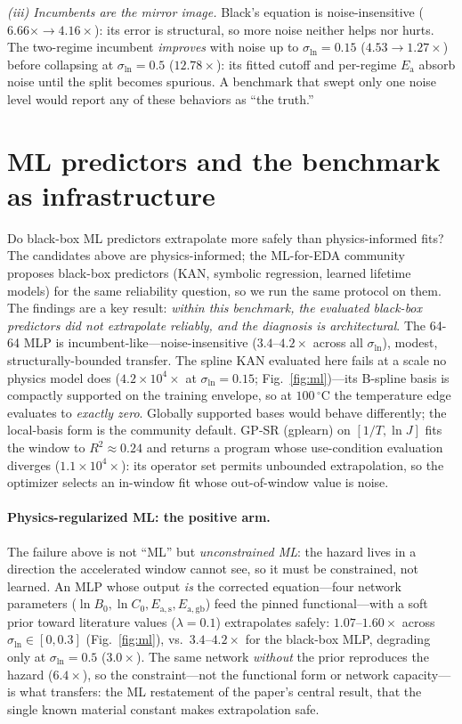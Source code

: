 \documentclass{article}
\newcommand{\Ea}{E_{\mathrm{a}}}
\newcommand{\sln}{\sigma_{\ln}}
\begin{document}
\emph{(iii) Incumbents are the mirror image.} Black's equation is
noise-insensitive ($6.66\times\to4.16\times$): its error is structural, so more
noise neither helps nor hurts. The two-regime incumbent \emph{improves} with
noise up to $\sln=0.15$ ($4.53\to1.27\times$) before collapsing at $\sln=0.5$
($12.78\times$): its fitted cutoff and per-regime $\Ea$ absorb noise until the
split becomes spurious. A benchmark that swept only one noise level would
report any of these behaviors as ``the truth.''

\section{ML predictors and the benchmark as infrastructure}
\label{sec:ml}

Do black-box ML predictors extrapolate more safely than physics-informed fits?
The candidates above are physics-informed; the ML-for-EDA community proposes
black-box predictors (KAN, symbolic regression, learned lifetime models) for
the same reliability question, so we run the same protocol on them. The
findings are a key result: \emph{within this benchmark, the evaluated black-box
predictors did not extrapolate reliably, and the diagnosis is architectural}. The 64-64
MLP is incumbent-like---noise-insensitive
($3.4$--$4.2\times$ across all $\sln$), modest, structurally-bounded transfer.
The spline KAN evaluated here fails at a scale no physics model does
($4.2\times10^{4}\times$ at $\sln=0.15$; Fig.~\ref{fig:ml})---its B-spline basis
is compactly supported on the training envelope, so at $100\,^\circ$C the
temperature edge evaluates to \emph{exactly zero}. Globally supported bases
would behave differently; the local-basis form is the community default. GP-SR
(gplearn) on $[1/T,\ln J]$ fits the window to $R^2\approx0.24$ and returns a
program whose use-condition evaluation diverges ($1.1\times10^{4}\times$): its
operator set permits unbounded extrapolation, so the optimizer selects an
in-window fit whose out-of-window value is noise.

\paragraph{Physics-regularized ML: the positive arm.} The failure above is not
``ML'' but \emph{unconstrained ML}: the hazard lives in a direction the
accelerated window cannot see, so it must be constrained, not learned. An MLP
whose output \emph{is} the corrected equation---four network parameters
($\ln B_0,\ln C_0,E_{\mathrm{a,s}},E_{\mathrm{a,gb}}$) feed the pinned
functional---with a soft prior toward literature values ($\lambda=0.1$)
extrapolates safely: $1.07$--$1.60\times$ across $\sln\in[0,0.3]$
(Fig.~\ref{fig:ml}), vs.\ $3.4$--$4.2\times$ for the black-box MLP, degrading
only at $\sln=0.5$ ($3.0\times$). The same network \emph{without} the prior
reproduces the hazard ($6.4\times$), so the constraint---not the functional form
or network capacity---is what transfers: the ML restatement of the paper's
central result, that the single known material constant makes extrapolation
safe.
\end{document}
